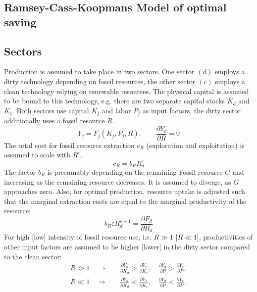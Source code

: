 \subsection{Ramsey-Cass-Koopmans Model of optimal saving}


\subsection{Sectors}

Production is assumed to take place in two sectors. One sector $(d)$ employs a dirty technology depending on fossil resources, the other sector $(c)$ employs a clean technology relying on renewable resources. The physical capital is assumed to be bound to this technology, e.g. there are two separate capital stocks $K_d$ and $K_c$. Both sectors use capital $K_j$ and labor $P_j$ as input factors, the dirty sector additionally uses a fossil resource $R$.
\begin{equation}
	Y_j = F_j(K_j,P_j,R), \qquad \frac{\partial Y_c}{\partial R} = 0 	
	\label{eq:production}
\end{equation}
The total cost for fossil resource extraction $c_R$ (exploration and exploitation) is assumed to scale with $R^{\varepsilon}$.
\begin{equation}
	c_R = b_R R_d^{\varepsilon}
	\label{resource_extraction_cost}
\end{equation}
The factor $b_R$ is presumably depending on the remaining Fossil resource $G$ and increasing as the remaining resource decreases. It is assumed to diverge, as $G$ approaches zero. Also, for optimal production, resource uptake is adjusted such that the marginal extraction costs are equal to the marginal productivity of the resource:
\begin{equation}
	b_R \varepsilon R_{d}^{\varepsilon-1} = \frac{\partial F_d}{\partial R_d}
	\label{marginal_resource_extraction_cost}
\end{equation}
For high [low] intensity of fossil resource use, i.e. $R \gg 1$ [$R \ll 1$], productivities of other input factors are assumed to be higher [lower] in the dirty sector compared to the clean sector:
\begin{align}
	R \gg 1 \quad \Rightarrow & \quad \frac{\partial Y_d}{\partial K_d} > \frac{\partial Y_c}{ \partial K_c}, \quad \frac{\partial Y_d}{\partial P} > \frac{\partial Y_c}{ \partial P}, \\
	R \ll 1 \quad \Rightarrow & \quad \frac{\partial Y_d}{\partial K_d} < \frac{\partial Y_c}{ \partial K_c}, \quad \frac{\partial Y_d}{\partial P} < \frac{\partial Y_c}{ \partial P}.
	\label{eq:input_factor_productivities}
\end{align}
